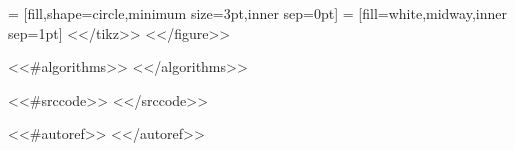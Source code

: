  = [fill,shape=circle,minimum size=3pt,inner sep=0pt]
  = [fill=white,midway,inner sep=1pt]
<</tikz>>
<</figure>>

<<#algorithms>>
\renewcommand{\listalgorithmname}{<<&listname>>}
<</algorithms>>

<<#srccode>>
\lstset{language=Python,style=custompy,captionpos=b}
\renewcommand{\lstlistingname}{<<&lstlistingname>>}
\renewcommand{\lstlistlistingname}{<<&lstlistlistingname>>}
<</srccode>>

<<#autoref>>
\def\partautorefname{<<&part>>}
\def\chapterautorefname{<<&chapter>>}
\def\sectionautorefname{<<&section>>}
\def\subsectionautorefname{<<&subsection>>}
\def\figureautorefname{<<&figure>>}
\def\tableautorefname{<<&table>>}
\def\algorithmautorefname{<<&algorithm>>}
\def\lstinputlistingautorefname{<<&listing>>}
<</autoref>>
